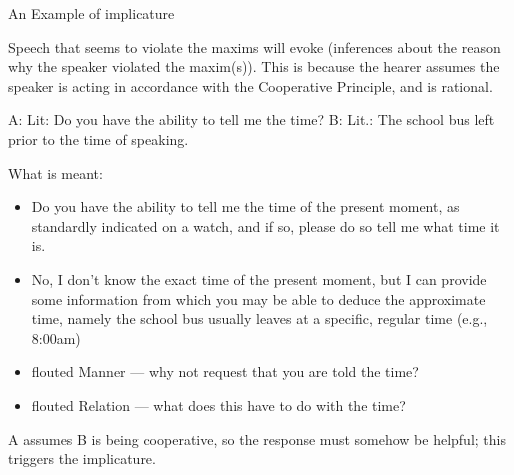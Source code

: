 \documentclass{beamer}
\begin{document}
\begin{frame}[allowframebreaks]{An Example of implicature}

Speech that seems to violate the maxims will evoke 
(inferences about the reason why the speaker violated the maxim(s)).
This is because the hearer assumes the speaker is acting in accordance
with the Cooperative Principle, and is rational.
\begin{exe}
  \ex A: 
  \trans Lit: Do you have the ability to tell me the time?
  \ex B: 
  \trans Lit.: The school bus left prior to the time of speaking.
\end{exe}
\framebreak
What is meant:
\begin{itemize}
\item [A] Do you have the ability to tell me the time of the present moment, as standardly indicated on a watch, and if so, please do so tell me what time it is.
\item [B] No, I don't know the exact time of the present moment, but I can provide some information from which you may be able to deduce the approximate time, namely the school bus usually leaves at a specific, regular time (e.g., 8:00am)
\end{itemize}

\begin{itemize}
\item [A] flouted Manner --- why not request that you are told the time?
\item [B] flouted Relation --- what does this have to do with the time?
\end{itemize}

A assumes B is being cooperative, so the response must somehow be helpful; this triggers the implicature.


\end{frame}
\end{document}
